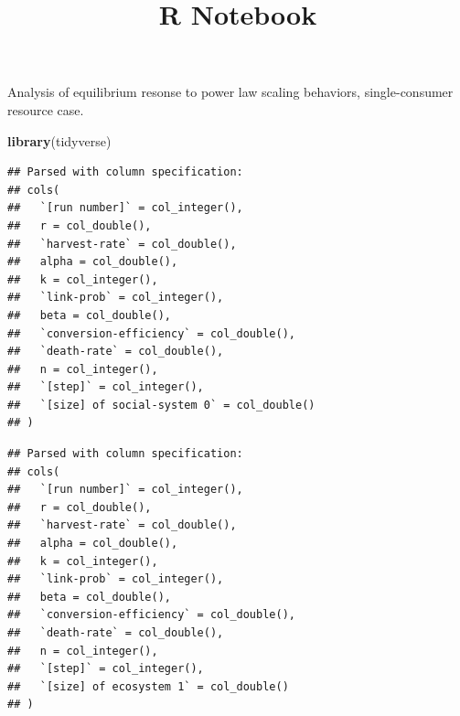 \documentclass[]{article}
\title{R Notebook}
\author{}
\date{}
\newenvironment{Shaded}{}{}
\newcommand{\KeywordTok}[1]{\textcolor[rgb]{0.00,0.44,0.13}{\textbf{{#1}}}}
\newcommand{\DataTypeTok}[1]{\textcolor[rgb]{0.56,0.13,0.00}{{#1}}}
\newcommand{\DecValTok}[1]{\textcolor[rgb]{0.25,0.63,0.44}{{#1}}}
\newcommand{\StringTok}[1]{\textcolor[rgb]{0.25,0.44,0.63}{{#1}}}
\newcommand{\NormalTok}[1]{{#1}}
\begin{document}
\maketitle

Analysis of equilibrium resonse to power law scaling behaviors,
single-consumer resource case.

\begin{Shaded}
\begin{Highlighting}[]
\KeywordTok{library}\NormalTok{(tidyverse)}
\end{Highlighting}
\end{Shaded}

\begin{Shaded}
\end{Shaded}

\begin{verbatim}
## Parsed with column specification:
## cols(
##   `[run number]` = col_integer(),
##   r = col_double(),
##   `harvest-rate` = col_double(),
##   alpha = col_double(),
##   k = col_integer(),
##   `link-prob` = col_integer(),
##   beta = col_double(),
##   `conversion-efficiency` = col_double(),
##   `death-rate` = col_double(),
##   n = col_integer(),
##   `[step]` = col_integer(),
##   `[size] of social-system 0` = col_double()
## )
\end{verbatim}

\begin{Shaded}
\end{Shaded}

\begin{verbatim}
## Parsed with column specification:
## cols(
##   `[run number]` = col_integer(),
##   r = col_double(),
##   `harvest-rate` = col_double(),
##   alpha = col_double(),
##   k = col_integer(),
##   `link-prob` = col_integer(),
##   beta = col_double(),
##   `conversion-efficiency` = col_double(),
##   `death-rate` = col_double(),
##   n = col_integer(),
##   `[step]` = col_integer(),
##   `[size] of ecosystem 1` = col_double()
## )
\end{verbatim}
\end{document}
